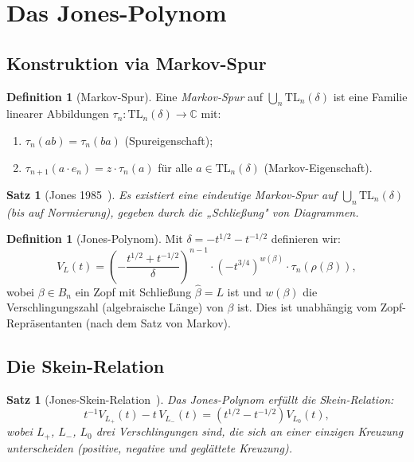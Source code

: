 \documentclass[12pt,a4paper]{amsart}
\newtheorem{satz}[theorem]{Satz}
\theoremstyle{definition}
\newtheorem{definition_de}[theorem]{Definition}
\theoremstyle{remark}
\begin{document}
\section{Das Jones-Polynom}

\subsection{Konstruktion via Markov-Spur}

\begin{definition_de}[Markov-Spur]
Eine \emph{Markov-Spur} auf $\bigcup_n \mathrm{TL}_n(\delta)$ ist eine
Familie linearer Abbildungen $\tau_n \colon \mathrm{TL}_n(\delta) \to \mathbb{C}$
mit:
\begin{enumerate}[label=\roman*)]
\item $\tau_n(ab) = \tau_n(ba)$ (Spureigenschaft);
\item $\tau_{n+1}(a \cdot e_n) = z \cdot \tau_n(a)$ für alle
      $a \in \mathrm{TL}_n(\delta)$ (Markov-Eigenschaft).
\end{enumerate}
\end{definition_de}

\begin{satz}[Jones 1985~\cite{Jones1985}]
Es existiert eine eindeutige Markov-Spur auf $\bigcup_n \mathrm{TL}_n(\delta)$
(bis auf Normierung), gegeben durch die „Schließung" von Diagrammen.
\end{satz}

\begin{definition_de}[Jones-Polynom]
Mit $\delta = -t^{1/2} - t^{-1/2}$ definieren wir:
\[
    V_L(t) = \left( -\frac{t^{1/2} + t^{-1/2}}{\delta} \right)^{n-1}
    \cdot \left( -t^{3/4} \right)^{w(\beta)} \cdot \tau_n(\rho(\beta)),
\]
wobei $\beta \in B_n$ ein Zopf mit Schließung $\hat{\beta} = L$ ist und
$w(\beta)$ die Verschlingungszahl (algebraische Länge) von $\beta$ ist.
Dies ist unabhängig vom Zopf-Repräsentanten (nach dem Satz von Markov).
\end{definition_de}

\subsection{Die Skein-Relation}

\begin{satz}[Jones-Skein-Relation~\cite{Jones1985}]
Das Jones-Polynom erfüllt die Skein-Relation:
\[
    t^{-1} V_{L_+}(t) - t \, V_{L_-}(t) = (t^{1/2} - t^{-1/2}) V_{L_0}(t),
\]
wobei $L_+$, $L_-$, $L_0$ drei Verschlingungen sind, die sich an einer
einzigen Kreuzung unterscheiden (positive, negative und geglättete Kreuzung).
\end{satz}
\end{document}
